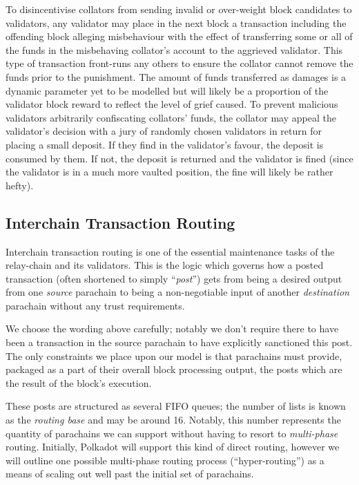 \documentclass[9pt,oneside]{amsart}
\begin{document}
\begin{multicols}{2}
 To disincentivise collators from sending invalid or over-weight block candidates to validators, any validator may place in the next block a transaction including the offending block alleging misbehaviour with the effect of transferring some or all of the funds in the misbehaving collator's account to the aggrieved validator. This type of transaction front-runs any others to ensure the collator cannot remove the funds prior to the punishment. The amount of funds transferred as damages is a dynamic parameter yet to be modelled but will likely be a proportion of the validator block reward to reflect the level of grief caused. To prevent malicious validators arbitrarily confiscating collators' funds, the collator may appeal the validator's decision with a jury of randomly chosen validators in return for placing a small deposit. If they find in the validator's favour, the deposit is consumed by them. If not, the deposit is returned and the validator is fined (since the validator is in a much more vaulted position, the fine will likely be rather hefty).

\subsection{Interchain Transaction Routing}
\label{interchain-transaction-routing}

 Interchain transaction routing is one of the essential maintenance tasks of the relay-chain and its validators. This is the logic which governs how a posted transaction (often shortened to simply ``\emph{post}'') gets from being a desired output from one \emph{source} parachain to being a non-negotiable input of another \emph{destination} parachain without any trust requirements.

 We choose the wording above carefully; notably we don't require there to have been a transaction in the source parachain to have explicitly sanctioned this post. The only constraints we place upon our model is that parachains must provide, packaged as a part of their overall block processing output, the posts which are the result of the block's execution.

 These posts are structured as several FIFO queues; the number of lists is known as the \emph{routing base} and may be around 16. Notably, this number represents the quantity of parachains we can support without having to resort to \emph{multi-phase} routing. Initially, Polkadot will support this kind of direct routing, however we will outline one possible multi-phase routing process (``hyper-routing'') as a means of scaling out well past the initial set of parachains.


\end{multicols}
\end{document}
